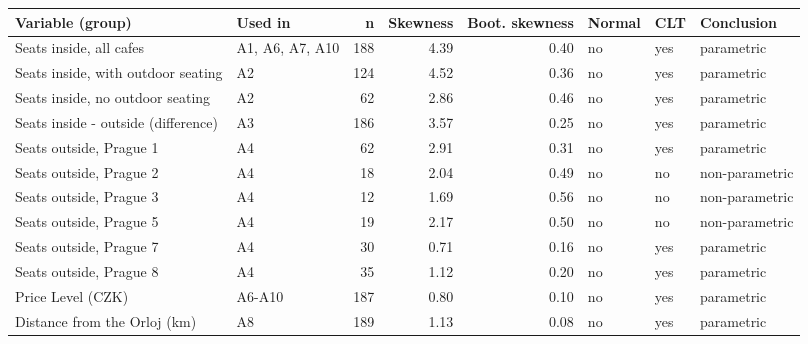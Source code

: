 \begin{tabular}{P{3.6cm}P{1.6cm}rrrlll}
  \toprule
Variable (group) & Used in & n & Skewness & Boot. skewness & Normal & CLT & Conclusion \\ 
  \midrule
Seats inside, all cafes & A1, A6, A7, A10 & 188 & 4.39 & 0.40 & no & yes & parametric \\ 
  Seats inside, with outdoor seating & A2 & 124 & 4.52 & 0.36 & no & yes & parametric \\ 
  Seats inside, no outdoor seating & A2 &  62 & 2.86 & 0.46 & no & yes & parametric \\ 
  Seats inside - outside (difference) & A3 & 186 & 3.57 & 0.25 & no & yes & parametric \\ 
  Seats outside, Prague 1 & A4 &  62 & 2.91 & 0.31 & no & yes & parametric \\ 
  Seats outside, Prague 2 & A4 &  18 & 2.04 & 0.49 & no & no & non-parametric \\ 
  Seats outside, Prague 3 & A4 &  12 & 1.69 & 0.56 & no & no & non-parametric \\ 
  Seats outside, Prague 5 & A4 &  19 & 2.17 & 0.50 & no & no & non-parametric \\ 
  Seats outside, Prague 7 & A4 &  30 & 0.71 & 0.16 & no & yes & parametric \\ 
  Seats outside, Prague 8 & A4 &  35 & 1.12 & 0.20 & no & yes & parametric \\ 
  Price Level (CZK) & A6-A10 & 187 & 0.80 & 0.10 & no & yes & parametric \\ 
  Distance from the Orloj (km) & A8 & 189 & 1.13 & 0.08 & no & yes & parametric \\ 
   \bottomrule
\end{tabular}
